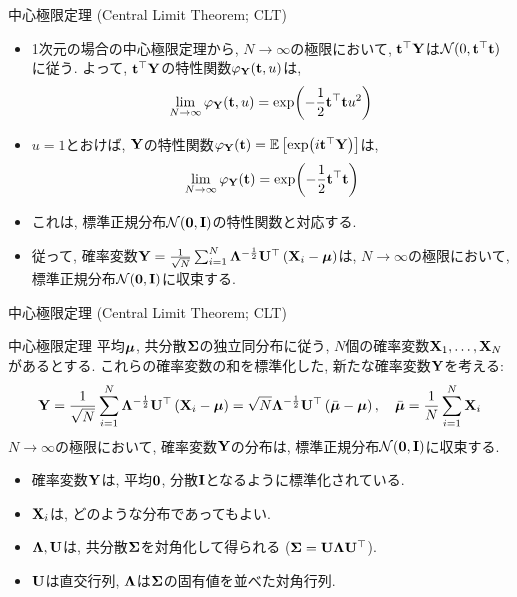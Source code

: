 \documentclass[dvipdfmx,notheorems,t]{beamer}
\begin{document}
\begin{frame}{中心極限定理 (Central Limit Theorem; CLT)}
\begin{itemize}
  \item 1次元の場合の中心極限定理から, $N \to \infty$の極限において,
  $\vb{t}^\top \vb{Y}$は$\mathcal{N}(0, \vb{t}^\top \vb{t})$に従う.
  よって, $\vb{t}^\top \vb{Y}$の特性関数$\varphi_{\vb{Y}}(\vb{t}, u)$は,
  \begin{align*}
    \lim_{N \to \infty} \varphi_{\vb{Y}}(\vb{t}, u)
    = \exp(-\frac{1}{2} \vb{t}^\top \vb{t} u^2)
  \end{align*}

  \item $u = 1$とおけば, $\vb{Y}$の特性関数$\varphi_{\vb{Y}}(\vb{t}) = \operatorname{\mathbb{E}} \left[ \exp(i \vb{t}^\top \vb{Y}) \right]$は,
  \begin{align*}
    \lim_{N \to \infty} \varphi_{\vb{Y}}(\vb{t})
    = \exp(-\frac{1}{2} \vb{t}^\top \vb{t})
  \end{align*}
  \item これは, 標準正規分布$\mathcal{N}(\vb{0}, \vb{I})$の特性関数と対応する.
  \item 従って, 確率変数$\vb{Y} = \frac{1}{\sqrt{N}} \sum_{i = 1}^N
  \vb{\Lambda}^{-\frac{1}{2}} \vb{U}^\top \left( \vb{X}_i - \vb*{\mu} \right)$は,
  $N \to \infty$の極限において, 標準正規分布$\mathcal{N}(\vb{0}, \vb{I})$に収束する.
\end{itemize}
\end{frame}

\begin{frame}{中心極限定理 (Central Limit Theorem; CLT)}
\begin{block}{中心極限定理}
  平均$\vb*{\mu}$, 共分散$\vb{\Sigma}$の独立同分布に従う, $N$個の確率変数$\vb{X}_1, \ldots, \vb{X}_N$があるとする.
  これらの確率変数の和を標準化した, 新たな確率変数$\vb{Y}$を考える:
  {\small \begin{align*}
    \vb{Y} = \frac{1}{\sqrt{N}} \sum_{i = 1}^N \vb{\Lambda}^{-\frac{1}{2}} \vb{U}^\top \left( \vb{X}_i - \vb*{\mu} \right)
      = \sqrt{N} \vb{\Lambda}^{-\frac{1}{2}} \vb{U}^\top \left( \bar{\vb*{\mu}} - \vb*{\mu} \right), \quad
    \bar{\vb*{\mu}} = \frac{1}{N} \sum_{i = 1}^N \vb{X}_i
  \end{align*}}
  $N \to \infty$の極限において, 確率変数$\vb{Y}$の分布は, 標準正規分布$\mathcal{N}(\vb{0}, \vb{I})$に収束する.
\end{block}

\begin{itemize}
  \item 確率変数$\vb{Y}$は, 平均$\vb{0}$, 分散$\vb{I}$となるように標準化されている.
  \item $\vb{X}_i$は, どのような分布であってもよい.
  \item $\vb{\Lambda}, \vb{U}$は, 共分散$\vb{\Sigma}$を対角化して得られる ($\vb{\Sigma} = \vb{U} \vb{\Lambda} \vb{U}^\top$).
  \item $\vb{U}$は直交行列, $\vb{\Lambda}$は$\vb{\Sigma}$の固有値を並べた対角行列.
\end{itemize}
\end{frame}
\end{document}
